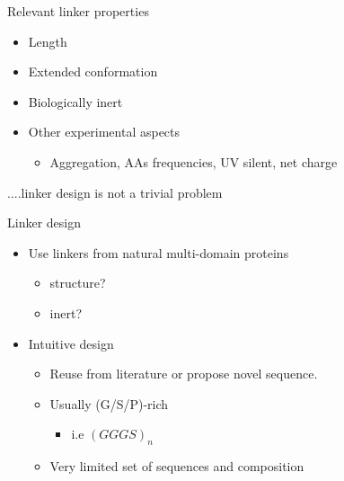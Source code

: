 \documentclass{beamer}
\begin{document}
\begin{frame}{Relevant linker properties}
\begin{itemize}
  \item Length
  \item Extended conformation
  \item Biologically inert  %
  \item Other experimental aspects
    \begin{itemize}
     \item Aggregation, AAs frequencies, UV silent, net charge
    \end{itemize}
\end{itemize}
\pause
\vspace{15px}
\Large{....linker design is not a trivial problem}
\end{frame}



\begin{frame}{Linker design}
\begin{itemize}
 \item Use linkers from natural multi-domain proteins
 \pause
 \begin{itemize}
  \item structure?
  \item inert?

 \pause 
 \end{itemize}
 \item Intuitive design
 \pause
 \begin{itemize}
  \item Reuse from literature or propose novel sequence. 
  \item Usually (G/S/P)-rich 
  \begin{itemize}
   \item  i.e $(GGGS)_n$ 
  \end{itemize}
  \item Very limited set of sequences and composition
  \end{itemize}

\end{itemize}
\end{frame}
\end{document}
